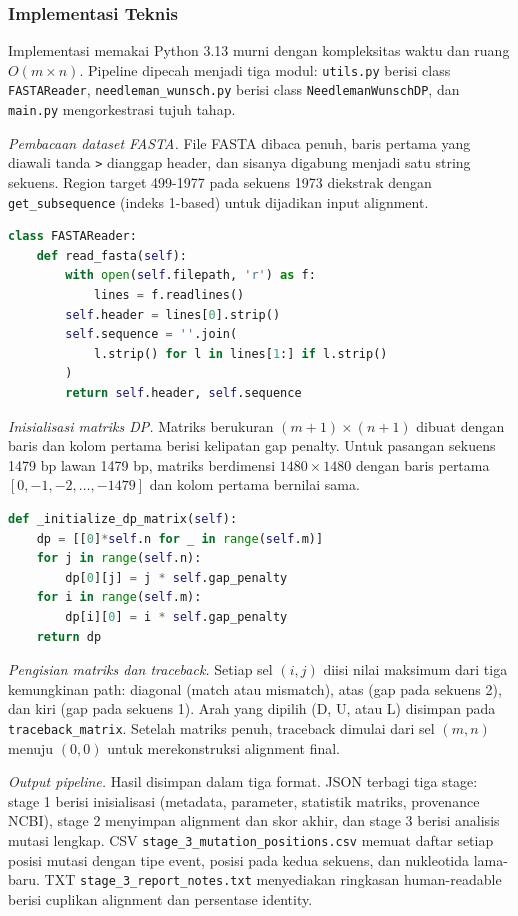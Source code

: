 \documentclass[conference]{IEEEtran}
\begin{document}
\subsubsection{Implementasi Teknis}
Implementasi memakai Python 3.13 murni dengan kompleksitas waktu dan ruang $O(m \times n)$. Pipeline dipecah menjadi tiga modul: \texttt{utils.py} berisi class \texttt{FASTAReader}, \texttt{needleman\_wunsch.py} berisi class \texttt{NeedlemanWunschDP}, dan \texttt{main.py} mengorkestrasi tujuh tahap.

\textit{Pembacaan dataset FASTA.} File FASTA dibaca penuh, baris pertama yang diawali tanda \texttt{>} dianggap header, dan sisanya digabung menjadi satu string sekuens. Region target 499-1977 pada sekuens 1973 diekstrak dengan \texttt{get\_subsequence} (indeks 1-based) untuk dijadikan input alignment.

\begin{lstlisting}[language=Python]
class FASTAReader:
    def read_fasta(self):
        with open(self.filepath, 'r') as f:
            lines = f.readlines()
        self.header = lines[0].strip()
        self.sequence = ''.join(
            l.strip() for l in lines[1:] if l.strip()
        )
        return self.header, self.sequence
\end{lstlisting}

\textit{Inisialisasi matriks DP.} Matriks berukuran $(m{+}1) \times (n{+}1)$ dibuat dengan baris dan kolom pertama berisi kelipatan gap penalty. Untuk pasangan sekuens 1479 bp lawan 1479 bp, matriks berdimensi $1480 \times 1480$ dengan baris pertama $[0, -1, -2, \dots, -1479]$ dan kolom pertama bernilai sama.

\begin{lstlisting}[language=Python]
def _initialize_dp_matrix(self):
    dp = [[0]*self.n for _ in range(self.m)]
    for j in range(self.n):
        dp[0][j] = j * self.gap_penalty
    for i in range(self.m):
        dp[i][0] = i * self.gap_penalty
    return dp
\end{lstlisting}

\textit{Pengisian matriks dan traceback.} Setiap sel $(i, j)$ diisi nilai maksimum dari tiga kemungkinan path: diagonal (match atau mismatch), atas (gap pada sekuens 2), dan kiri (gap pada sekuens 1). Arah yang dipilih (D, U, atau L) disimpan pada \texttt{traceback\_matrix}. Setelah matriks penuh, traceback dimulai dari sel $(m, n)$ menuju $(0, 0)$ untuk merekonstruksi alignment final.

\textit{Output pipeline.} Hasil disimpan dalam tiga format. JSON terbagi tiga stage: stage 1 berisi inisialisasi (metadata, parameter, statistik matriks, provenance NCBI), stage 2 menyimpan alignment dan skor akhir, dan stage 3 berisi analisis mutasi lengkap. CSV \texttt{stage\_3\_mutation\_positions.csv} memuat daftar setiap posisi mutasi dengan tipe event, posisi pada kedua sekuens, dan nukleotida lama-baru. TXT \texttt{stage\_3\_report\_notes.txt} menyediakan ringkasan human-readable berisi cuplikan alignment dan persentase identity.
\end{document}
